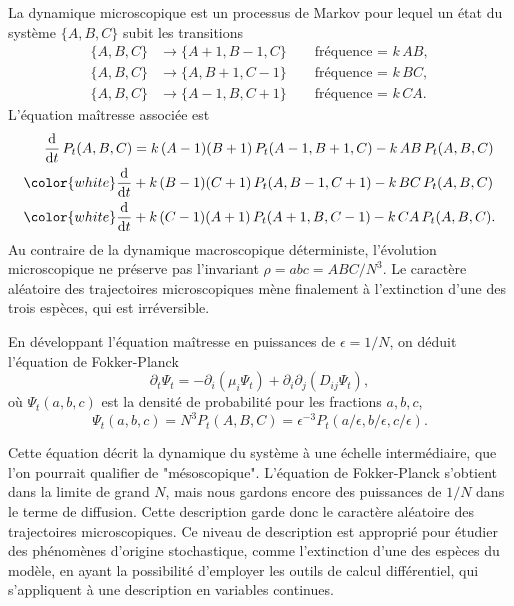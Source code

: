 \documentclass[openany,a4paper,12pt]{article}
\begin{document}
\par La dynamique microscopique est un processus de Markov pour lequel un état du système $\{A,B,C\}$ subit les transitions 
%
\begin{equation}\label{dyn_micro}
\begin{split}
	\{A,B,C\} &\longrightarrow \{A+1,B-1,C\}  \qquad \text{fréquence = } k\, AB, \\
	\{A,B,C\} &\longrightarrow \{A,B+1,C-1\}  \qquad \text{fréquence = } k\, BC, \\
	\{A,B,C\} &\longrightarrow \{A-1,B,C+1\}  \qquad \text{fréquence = } k\, CA.
\end{split}
\end{equation}
%
L'équation maîtresse associée est 
%
\begin{equation}\label{eq_maitresse}
\begin{split}
	\frac{\dd}{\dd t}\, P_t(A,B,C) 
	&= k\, (A-1)(B+1)\, P_t(A-1,B+1,C) - k\, AB\, P_t(A,B,C) \\
	{\color{white}\frac{\dd}{\dd t}} %
	&+ k\, (B-1)(C+1)\, P_t(A,B-1,C+1) - k\, BC\, P_t(A,B,C) \\
	{\color{white}\frac{\dd}{\dd t}} %
	&+ k\, (C-1)(A+1)\, P_t(A+1,B,C-1) - k\, CA\, P_t(A,B,C).
\end{split}
\end{equation}
% 
Au contraire de la dynamique macroscopique déterministe, l'évolution microscopique ne préserve pas l'invariant $\rho = abc = ABC/N^3$. Le caractère aléatoire des trajectoires microscopiques mène finalement à l'extinction d'une des trois espèces, qui est irréversible. 

\par En développant l'équation maîtresse en puissances de $\epsilon = 1/N$, on déduit l'équation de Fokker-Planck 
%
\begin{equation}\label{eq_FP}
	\partial_t \Psi_t = - \partial_i ( \mu_i \Psi_t ) + \partial_i\partial_j (D_{ij} \Psi_t),
\end{equation}
%
où $\Psi_t(a,b,c)$ est la densité de probabilité pour les fractions $a,b,c$,
%
\begin{equation}\label{lien_psi_proba}
	\Psi_t(a,b,c) = N^3 P_t(A,B,C) = \epsilon^{-3} P_t(a/\epsilon, b/\epsilon, c/\epsilon).
\end{equation}

\par Cette équation décrit la dynamique du système à une échelle intermédiaire, que l'on pourrait qualifier de "mésoscopique". L'équation de Fokker-Planck s'obtient dans la limite de grand $N$, mais nous gardons encore des puissances de $1/N$ dans le terme de diffusion. Cette description garde donc le caractère aléatoire des trajectoires microscopiques. Ce niveau de description est approprié pour étudier des phénomènes d'origine stochastique, comme l'extinction d'une des espèces du modèle, en ayant la possibilité d'employer les outils de calcul différentiel, qui s'appliquent à une description en variables continues. 
\end{document}
